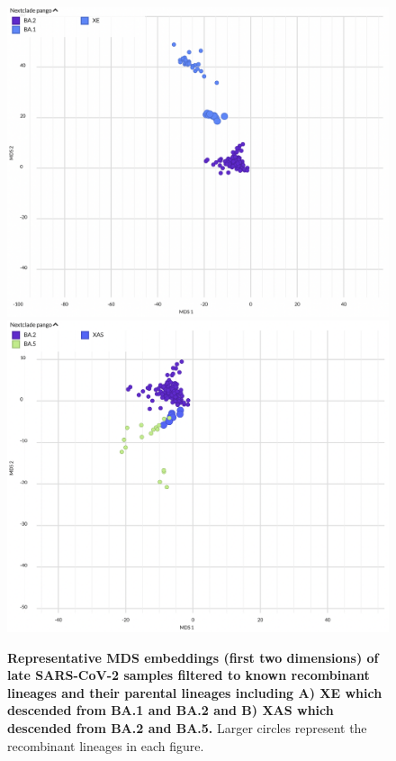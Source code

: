 \begin{figure}[!h]
\includegraphics[width=0.75\columnwidth]{figures/sarscov2-test-mds-reassortment-XE-BA1-BA2.png}\\
\includegraphics[width=0.75\columnwidth]{figures/sarscov2-test-mds-reassortment-XAS-BA2-BA5.png}
\caption{{\bf Representative MDS embeddings (first two dimensions) of late SARS-CoV-2 samples filtered to known recombinant lineages and their parental lineages including A) XE which descended from BA.1 and BA.2 and B) XAS which descended from BA.2 and BA.5.}
Larger circles represent the recombinant lineages in each figure.}\label{S_Fig_sarscov2_late_embeddings_mds_recombinant_examples}
\end{figure}

% 
